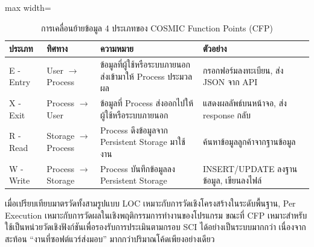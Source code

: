 \begin{table}[H]
    \centering

    \begin{adjustbox}{max width=\textwidth}
        \renewcommand{\arraystretch}{1.3}
        \setlength{\tabcolsep}{6pt}

        \begin{tabular}{|p{2.8cm}|p{3.8cm}|p{4.8cm}|p{4.8cm}|}
            \hline
            {\boldfont ประเภท} &
            {\boldfont ทิศทาง} &
            {\boldfont ความหมาย} &
            {\boldfont ตัวอย่าง} \\
            \hline

            E - Entry
            &
            User $\rightarrow$ Process
            &
            ข้อมูลที่ผู้ใช้หรือระบบภายนอกส่งเข้ามาให้ Process ประมวลผล
            &
            กรอกฟอร์มลงทะเบียน, ส่ง JSON จาก API
            \\
            \hline

            X - Exit
            &
            Process $\rightarrow$ User
            &
            ข้อมูลที่ Process ส่งออกไปให้ผู้ใช้หรือระบบภายนอก
            &
            แสดงผลลัพธ์บนหน้าจอ, ส่ง response กลับ
            \\
            \hline

            R - Read
            &
            Storage $\rightarrow$ Process
            &
            Process ดึงข้อมูลจาก Persistent Storage มาใช้งาน
            &
            ค้นหาข้อมูลลูกค้าจากฐานข้อมูล
            \\
            \hline

            W - Write
            &
            Process $\rightarrow$ Storage
            &
            Process บันทึกข้อมูลลง Persistent Storage
            &
            INSERT/UPDATE ลงฐานข้อมูล, เขียนลงไฟล์
            \\
            \hline

        \end{tabular}
\end{adjustbox}

\captionsetup{justification=centering, name=ตาราง}
\caption{การเคลื่อนย้ายข้อมูล 4 ประเภทของ COSMIC Function Points (CFP)}
\label{table:cfp-data-movement}
\end{table}

เมื่อเปรียบเทียบมาตรวัดทั้งสามรูปแบบ LOC เหมาะกับการวัดเชิงโครงสร้างในระดับพื้นฐาน, Per Execution เหมาะกับการวัดผลในเชิงพฤติกรรมการทำงานของโปรแกรม ขณะที่ CFP เหมาะสำหรับใช้เป็นหน่วยวัดเชิงฟังก์ชันเพื่อรองรับการประเมินตามกรอบ SCI ได้อย่างเป็นระบบมากกว่า เนื่องจากสะท้อน ``งานที่ซอฟต์แวร์ส่งมอบ'' มากกว่าปริมาณโค้ดเพียงอย่างเดียว~\cite{vanHeeringen2015size,abran2018cosmic}

